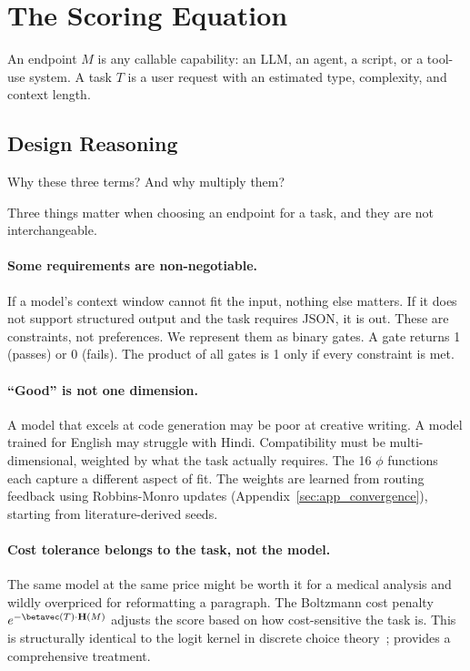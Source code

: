 \section{The Scoring Equation}
\label{sec:equation}

An endpoint $M$ is any callable capability: an LLM, an agent, a script, or a tool-use system. A task $T$ is a user request with an estimated type, complexity, and context length.

\subsection{Design Reasoning}

Why these three terms? And why multiply them?

Three things matter when choosing an endpoint for a task, and they are not interchangeable.

\paragraph{Some requirements are non-negotiable.} If a model's context window cannot fit the input, nothing else matters. If it does not support structured output and the task requires JSON, it is out. These are constraints, not preferences. We represent them as binary gates. A gate returns 1 (passes) or 0 (fails). The product of all gates is 1 only if every constraint is met.

\paragraph{``Good'' is not one dimension.} A model that excels at code generation may be poor at creative writing. A model trained for English may struggle with Hindi. Compatibility must be multi-dimensional, weighted by what the task actually requires. The 16 $\phi$ functions each capture a different aspect of fit. The weights are learned from routing feedback using Robbins-Monro updates (Appendix~\ref{sec:app_convergence}), starting from literature-derived seeds.

\paragraph{Cost tolerance belongs to the task, not the model.} The same model at the same price might be worth it for a medical analysis and wildly overpriced for reformatting a paragraph. The Boltzmann cost penalty $e^{-\betavec(T) \cdot \mathbf{H}(M)}$ adjusts the score based on how cost-sensitive the task is. This is structurally identical to the logit kernel in discrete choice theory~\citep{mcfadden1974conditional}; \citet{train2009discrete} provides a comprehensive treatment.

